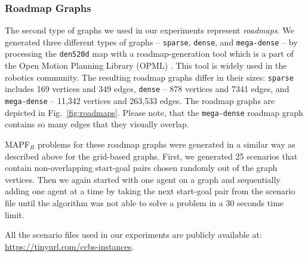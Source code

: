 \documentclass[review]{elsarticle}
\newcommand\konstantin[1]{\nb{\textbf{Konstantin:}}{red}{#1}}
\newcommand\roni[1]{\nb{\textbf{Roni:}}{green}{#1}}
\newcommand{\mapfr}{\ac{MAPF}$_R$\xspace}
\begin{document}
\subsubsection{Roadmap Graphs}
The second type of graphs we used in our experiments represent \emph{roadmaps}. 
We generated three different types of graphs -- \texttt{sparse}, \texttt{dense}, and \texttt{mega-dense} -- by processing the \texttt{den520d} map with a roadmap-generation tool which is a part of the Open Motion Planning Library (OPML) \cite{sucan2012opml}. This tool is widely used in the robotics community. The resulting roadmap graphs differ in their sizes: \texttt{sparse} includes 169 vertices and 349 edges, \texttt{dense} -- 878 vertices and 7341 edges, and \texttt{mega-dense} -- 11,342 vertices and 263,533 edges. The roadmap graphs are depicted in Fig.~\ref{fig:roadmaps}. Please note, that the \texttt{mega-dense} roadmap graph contains so many edges that they visually overlap.

\mapfr problems for these roadmap graphs were generated in a similar way as described above for the grid-based graphs. First, we generated 25 scenarios that contain non-overlapping start-goal pairs chosen randomly out of the graph vertices.
Then we again started with one agent on a graph and sequentially adding one agent at a time by taking the next start-goal pair from the scenario file until the algorithm was not able to solve a problem in a 30 seconds time limit.

All the scenario files used in our experiments are publicly available at: \url{https://tinyurl.com/ccbs-instances}.
\end{document}
